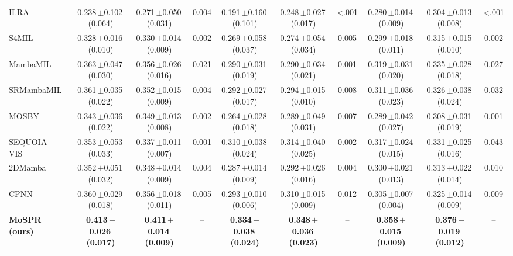 \begin{tabular}{lccccccccc}
ILRA~\citep{xiang2023ilra} & 0.238\,{\tiny$\pm$}0.102\,{\tiny(0.064)} & 0.271\,{\tiny$\pm$}0.050\,{\tiny(0.031)} & 0.004 & 0.191\,{\tiny$\pm$}0.160\,{\tiny(0.101)} & 0.248\,{\tiny$\pm$}0.027\,{\tiny(0.017)} & \textless.001 & 0.280\,{\tiny$\pm$}0.014\,{\tiny(0.009)} & 0.304\,{\tiny$\pm$}0.013\,{\tiny(0.008)} & \textless.001\\
S4MIL~\citep{fillioux2023s4mil} & 0.328\,{\tiny$\pm$}0.016\,{\tiny(0.010)} & 0.330\,{\tiny$\pm$}0.014\,{\tiny(0.009)} & 0.002 & 0.269\,{\tiny$\pm$}0.058\,{\tiny(0.037)} & 0.274\,{\tiny$\pm$}0.054\,{\tiny(0.034)} & 0.005 & 0.299\,{\tiny$\pm$}0.018\,{\tiny(0.011)} & 0.315\,{\tiny$\pm$}0.015\,{\tiny(0.010)} & 0.002\\
MambaMIL~\citep{yang2024mambamil} & 0.363\,{\tiny$\pm$}0.047\,{\tiny(0.030)} & 0.356\,{\tiny$\pm$}0.026\,{\tiny(0.016)} & 0.021 & 0.290\,{\tiny$\pm$}0.031\,{\tiny(0.019)} & 0.290\,{\tiny$\pm$}0.034\,{\tiny(0.021)} & 0.001 & 0.319\,{\tiny$\pm$}0.031\,{\tiny(0.020)} & 0.335\,{\tiny$\pm$}0.028\,{\tiny(0.018)} & 0.027\\
SRMambaMIL~\citep{yang2024mambamil} & 0.361\,{\tiny$\pm$}0.035\,{\tiny(0.022)} & 0.352\,{\tiny$\pm$}0.015\,{\tiny(0.009)} & 0.004 & 0.292\,{\tiny$\pm$}0.027\,{\tiny(0.017)} & 0.294\,{\tiny$\pm$}0.015\,{\tiny(0.010)} & 0.008 & 0.311\,{\tiny$\pm$}0.036\,{\tiny(0.023)} & 0.326\,{\tiny$\pm$}0.038\,{\tiny(0.024)} & 0.032\\
MOSBY~\citep{senbabaoglu2024mosby} & 0.343\,{\tiny$\pm$}0.036\,{\tiny(0.022)} & 0.349\,{\tiny$\pm$}0.013\,{\tiny(0.008)} & 0.002 & 0.264\,{\tiny$\pm$}0.028\,{\tiny(0.018)} & 0.289\,{\tiny$\pm$}0.049\,{\tiny(0.031)} & 0.007 & 0.289\,{\tiny$\pm$}0.042\,{\tiny(0.027)} & 0.308\,{\tiny$\pm$}0.031\,{\tiny(0.019)} & 0.001\\
SEQUOIA VIS~\citep{pizurica2024sequoia} & 0.353\,{\tiny$\pm$}0.053\,{\tiny(0.033)} & 0.337\,{\tiny$\pm$}0.011\,{\tiny(0.007)} & 0.001 & 0.310\,{\tiny$\pm$}0.038\,{\tiny(0.024)} & 0.314\,{\tiny$\pm$}0.040\,{\tiny(0.025)} & 0.002 & 0.317\,{\tiny$\pm$}0.024\,{\tiny(0.015)} & 0.331\,{\tiny$\pm$}0.025\,{\tiny(0.016)} & 0.043\\
2DMamba~\citep{zhang2025twodmamba} & 0.352\,{\tiny$\pm$}0.051\,{\tiny(0.032)} & 0.348\,{\tiny$\pm$}0.014\,{\tiny(0.009)} & 0.004 & 0.287\,{\tiny$\pm$}0.014\,{\tiny(0.009)} & 0.292\,{\tiny$\pm$}0.026\,{\tiny(0.016)} & 0.004 & 0.300\,{\tiny$\pm$}0.021\,{\tiny(0.013)} & 0.313\,{\tiny$\pm$}0.022\,{\tiny(0.014)} & 0.010\\
CPNN~\citep{nishimura2026cpnn} & 0.360\,{\tiny$\pm$}0.029\,{\tiny(0.018)} & 0.356\,{\tiny$\pm$}0.018\,{\tiny(0.011)} & 0.005 & 0.293\,{\tiny$\pm$}0.010\,{\tiny(0.006)} & 0.310\,{\tiny$\pm$}0.015\,{\tiny(0.009)} & 0.012 & 0.305\,{\tiny$\pm$}0.007\,{\tiny(0.004)} & 0.325\,{\tiny$\pm$}0.014\,{\tiny(0.009)} & 0.009\\
\midrule
\textbf{MoSPR (ours)} & \textbf{0.413\,{\tiny$\pm$}0.026\,{\tiny(0.017)}} & \textbf{0.411\,{\tiny$\pm$}0.014\,{\tiny(0.009)}} & -- & \textbf{0.334\,{\tiny$\pm$}0.038\,{\tiny(0.024)}} & \textbf{0.348\,{\tiny$\pm$}0.036\,{\tiny(0.023)}} & -- & \textbf{0.358\,{\tiny$\pm$}0.015\,{\tiny(0.009)}} & \textbf{0.376\,{\tiny$\pm$}0.019\,{\tiny(0.012)}} & --\\
\bottomrule
\end{tabular}